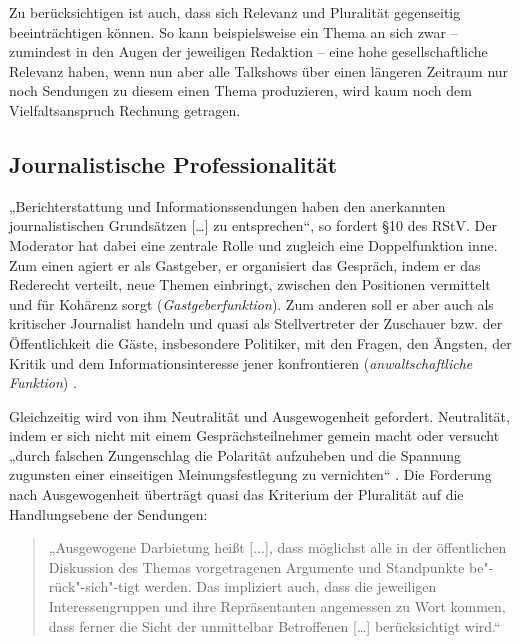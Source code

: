 Zu berücksichtigen ist auch, dass sich Relevanz und Pluralität gegenseitig beeinträchtigen können. So kann beispielsweise ein Thema an sich zwar – zumindest in den Augen der jeweiligen Redaktion – eine hohe gesellschaftliche Relevanz haben, wenn nun aber alle Talkshows über einen längeren Zeitraum nur noch Sendungen zu diesem einen Thema produzieren, wird kaum noch dem Vielfaltsanspruch Rechnung getragen.

\subsection{Journalistische Professionalität}

„Berichterstattung und Informationssendungen haben den anerkannten journalistischen Grundsätzen [\ldots] zu entsprechen“, so fordert §10 des RStV. Der Moderator hat dabei eine zentrale Rolle und zugleich eine Doppelfunktion inne. Zum einen agiert er als Gastgeber, er organisiert das Gespräch, indem er das Rederecht verteilt, neue Themen einbringt, zwischen den Positionen vermittelt und für Kohärenz sorgt (\textit{Gastgeberfunktion}). Zum anderen soll er aber auch als kritischer Journalist handeln und quasi als Stellvertreter der Zuschauer bzw. der Öffentlichkeit die Gäste, insbesondere Politiker, mit den Fragen, den Ängsten, der Kritik und dem Informationsinteresse jener konfrontieren (\textit{anwaltschaftliche Funktion}) \parencites[452f.]{schrottElefantenUnterSich1996}[25]{bucherLogikPolitikLogik2007}.

Gleichzeitig wird von ihm Neutralität und Ausgewogenheit gefordert. Neutralität, indem er sich nicht mit einem Gesprächsteilnehmer gemein macht oder versucht „durch falschen Zungenschlag die Polarität aufzuheben und die Spannung zugunsten einer einseitigen Meinungsfestlegung zu vernichten“ \parencite[106]{mahloZurDiskussionUm1956}. Die Forderung nach Ausgewogenheit überträgt quasi das Kriterium der Pluralität auf die Handlungsebene der Sendungen:

\begin{quote}
	„Ausgewogene Darbietung heißt [$\ldots$], dass möglichst alle in der öffentlichen Diskussion des Themas vorgetragenen Argumente und Standpunkte be"-rück"-sich"-tigt werden. Das impliziert auch, dass die jeweiligen Interessengruppen und ihre Repräsentanten angemessen zu Wort kommen, dass ferner die Sicht der unmittelbar Betroffenen [\ldots] berücksichtigt wird.“ \parencite[704]{schatzQualitaetFernsehprogrammenKriterien1992}
\end{quote}

